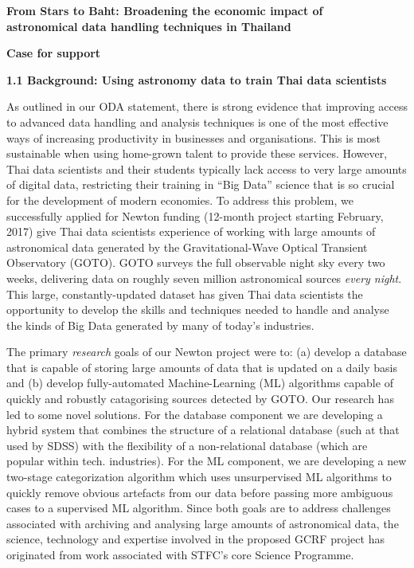 \documentclass[11pt]{article}
\begin{document}
\setcounter{figure}{0}
\noindent
{\LARGE \bf From Stars to Baht: Broadening the economic impact of \\
astronomical data handling techniques in Thailand}

\vspace{3mm}
\noindent
{\LARGE \bf Case for support}
\vspace{3mm}

\noindent
{\large \bf 1.1 Background: Using astronomy data to train Thai data scientists}

\noindent
As outlined in our ODA statement, there is strong evidence that improving access to advanced data handling and analysis techniques is one of the most effective ways of increasing productivity in businesses and organisations. This is most sustainable when using home-grown talent to provide these services. However, Thai data scientists and their students typically lack access to very large amounts of digital data, restricting their training in ``Big Data'' science that is so crucial for the development of modern economies. To address this problem, we successfully applied for Newton funding (12-month project starting February, 2017) give Thai data scientists experience of working with large amounts of astronomical data generated by the Gravitational-Wave Optical Transient Observatory (GOTO). GOTO surveys the full observable night sky every two weeks, delivering data on roughly seven million astronomical sources {\it every night}. This large, constantly-updated dataset has given Thai data scientists the opportunity to develop the skills and techniques needed to handle and analyse the kinds of Big Data generated by many of today's industries.

\vspace{2mm}
\noindent
The primary {\it research} goals of our Newton project were to: (a) develop a database that is capable of storing large amounts of data that is updated on a daily basis and (b) develop fully-automated Machine-Learning (ML) algorithms capable of quickly and robustly catagorising sources detected by GOTO. Our research has led to some novel solutions. For the database component we are developing a hybrid system that combines the structure of a relational database (such at that used by SDSS) with the flexibility of a non-relational database (which are popular within tech. industries). For the ML component, we are developing a new two-stage categorization algorithm which uses unsurpervised ML algorithms to quickly remove obvious artefacts from our data before passing more ambiguous cases to a supervised ML algorithm. Since both goals are to address challenges associated with archiving and analysing large amounts of astronomical data, the science, technology and expertise involved in the proposed GCRF project has originated from work associated with STFC's core Science Programme. 
\end{document}
